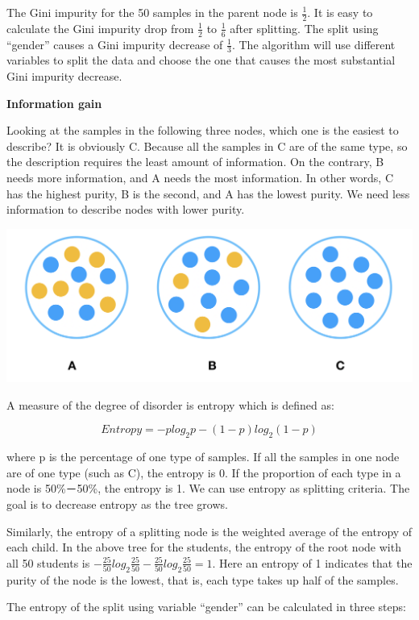 \documentclass[12pt,]{krantz}
\theoremstyle{definition}
\theoremstyle{definition}
\theoremstyle{definition}
\theoremstyle{remark}
\begin{document}
The Gini impurity for the 50 samples in the parent node is
\(\frac{1}{2}\). It is easy to calculate the Gini impurity drop from
\(\frac{1}{2}\) to \(\frac{1}{6}\) after splitting. The split using
``gender'' causes a Gini impurity decrease of \(\frac{1}{3}\). The
algorithm will use different variables to split the data and choose the
one that causes the most substantial Gini impurity decrease.

\textbf{Information gain}

Looking at the samples in the following three nodes, which one is the
easiest to describe? It is obviously C. Because all the samples in C are
of the same type, so the description requires the least amount of
information. On the contrary, B needs more information, and A needs the
most information. In other words, C has the highest purity, B is the
second, and A has the lowest purity. We need less information to
describe nodes with lower purity.

\includegraphics{../linhui.org/book/Figure/InfoGainEN.PNG}

A measure of the degree of disorder is entropy which is defined as:

\[Entropy=-plog_{2}p-(1-p)log_{2}(1-p)\]

where p is the percentage of one type of samples. If all the samples in
one node are of one type (such as C), the entropy is 0. If the
proportion of each type in a node is 50\%－50\%, the entropy is 1. We
can use entropy as splitting criteria. The goal is to decrease entropy
as the tree grows.

Similarly, the entropy of a splitting node is the weighted average of
the entropy of each child. In the above tree for the students, the
entropy of the root node with all 50 students is
\(-\frac{25}{50}log_{2}\frac{25}{50}-\frac{25}{50}log_{2}\frac{25}{50}=1\).
Here an entropy of 1 indicates that the purity of the node is the
lowest, that is, each type takes up half of the samples.

The entropy of the split using variable ``gender'' can be calculated in
three steps:
\end{document}
